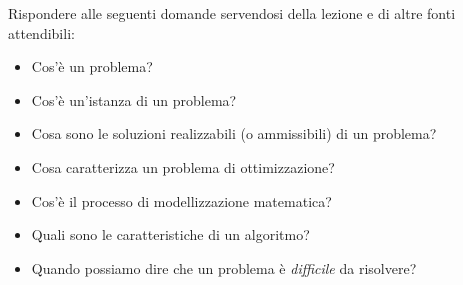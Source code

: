 \documentclass{beamer}
\begin{document}
\generatitolo

\begin{frame}{\domande}
Rispondere alle seguenti domande servendosi della lezione
e di altre fonti attendibili:

    \begin{itemize}
     \item Cos'\`e un problema?
     \item Cos'\`e un'istanza di un problema?
     \item Cosa sono le soluzioni realizzabili (o ammissibili) di un problema?
     \item Cosa caratterizza un problema di ottimizzazione?
     \item Cos'\`e il processo di modellizzazione matematica?
     \item Quali sono le caratteristiche di un algoritmo?
     \item Quando possiamo dire che un problema \`e \emph{difficile} da risolvere?
    \end{itemize}
\end{frame}
\end{document}
